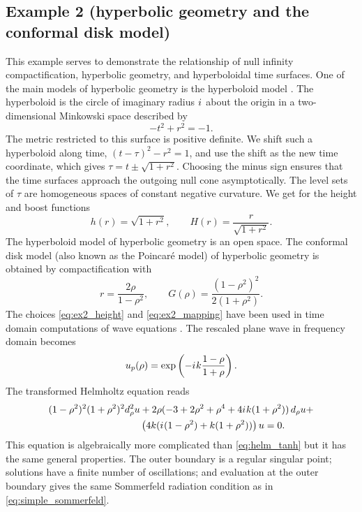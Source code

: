 \documentclass[draft,onefignum,onetabnum]{siamart190516}
\newcommand{\be}{\begin{equation}}
\newcommand{\ee}{\end{equation}}
\newcommand{\iu}{{i\mkern1mu}}
\begin{document}
\subsection{Example 2 (hyperbolic geometry and the conformal disk model)}
This example serves to demonstrate the relationship of null infinity compactification, hyperbolic geometry, and hyperboloidal time surfaces. One of the main models of hyperbolic geometry is the hyperboloid model \cite{thurston1979geometry, loustau2020hyperbolic}.  The hyperboloid is the circle of imaginary radius $\iu$ about the origin in a two-dimensional Minkowski space described by
\[ -t^2 + r^2 = -1. \]
The metric restricted to this surface is positive definite. We shift such a hyperboloid along time, $(t-\tau)^2 - r^2 = 1$, and use the shift as the new time coordinate, which gives $\tau = t \pm \sqrt{1+r^2}$. Choosing the minus sign ensures that the time surfaces approach the outgoing null cone asymptotically. The level sets of $\tau$ are homogeneous spaces of constant negative curvature. We get for the height and boost functions
\be \label{eq:ex2_height} h(r) = \sqrt{1+r^2}, \qquad H(r) = \frac{r}{\sqrt{1+r^2}}.\ee
The hyperboloid model of hyperbolic geometry is an open space. The conformal disk model (also known as the Poincar\'e model) of hyperbolic geometry is obtained by compactification with
\be\label{eq:ex2_mapping} r =  \frac{2\rho}{1-\rho^2}, \qquad G(\rho) = \frac{(1-\rho^2)^2}{2(1+\rho^2)}. \ee
The choices \eqref{eq:ex2_height} and \eqref{eq:ex2_mapping} have been used in time domain computations of wave equations \cite{FodorRacz04, fodor2008numerical, Bizo__2009, ZenginogluKidder10}. The rescaled plane wave in frequency domain becomes 
\[ u_p(\rho) = \exp\left(-\iu k \frac{1-\rho}{1+\rho}\right). \]
The transformed Helmholtz equation reads
\begin{align*} 
(1-\rho^2)^2 (1+\rho^2)^2 d_\rho^2 u &+ 2\rho (-3+2\rho^2+\rho^4 + 4\iu k (1+\rho^2) ) \,d_\rho u + \\
& \left( 4 k (\iu(1-\rho^2)+k(1+\rho^2))\right) u=0. 
\end{align*}
This equation is algebraically more complicated than \eqref{eq:helm_tanh} but it has the same general properties. The outer boundary is a regular singular point; solutions have a finite number of oscillations; and evaluation at the outer boundary gives the same Sommerfeld radiation condition as in \eqref{eq:simple_sommerfeld}.

\end{document}
